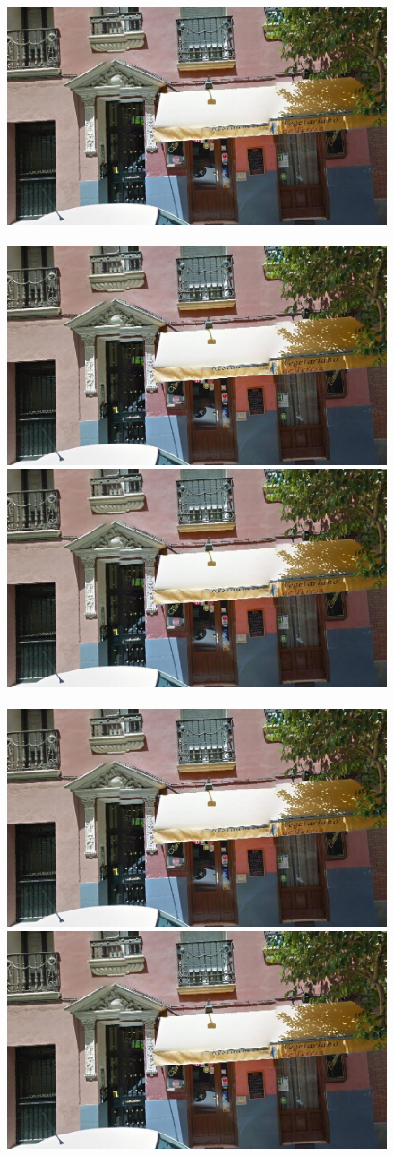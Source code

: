 \documentclass[runningheads]{llncs}
\begin{document}
\begin{figure}
\begin{minipage}{\linewidth}
\begin{minipage}{0.3\linewidth}
      \includegraphics[width=0.49\linewidth]{imgs/cutout_pitch04.jpg}
      \\ \vspace{-3mm} \\
      \includegraphics[width=0.49\linewidth]{imgs/cutout_pitch04.jpg}
      \includegraphics[width=0.49\linewidth]{imgs/cutout_pitch04.jpg}
      \\ \vspace{-3mm} \\
      \includegraphics[width=0.49\linewidth]{imgs/cutout_pitch04.jpg}
      \includegraphics[width=0.49\linewidth]{imgs/cutout_pitch04.jpg}

\end{minipage}
\end{minipage}
\end{figure}
\end{document}
